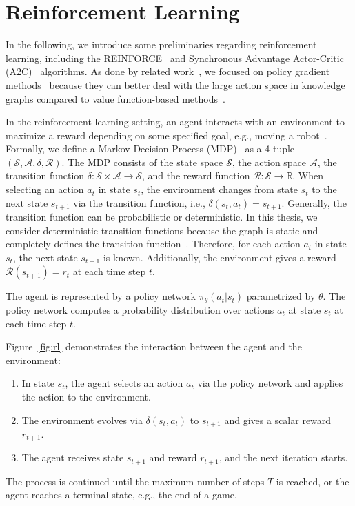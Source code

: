 \section{Reinforcement Learning}
\label{subsec:rl}
In the following, we introduce some preliminaries regarding reinforcement learning,
including the REINFORCE~\cite{Williams1992REINFORCE} and Synchronous Advantage Actor-Critic (A2C)~\cite{Mnih2016A2C} algorithms.
As done by related work~\cite{Xiong2017DeePpath, Das2018Minerva, Kaiser2021Reinforcement}, we focused on policy gradient methods~\cite{Sutton1998RL} because 
they can better deal with the large action space in knowledge graphs compared to value function-based methods~\cite{Xiong2017DeePpath}.

In the reinforcement learning setting, an agent interacts with an environment to maximize a reward 
depending on some specified goal, e.g., moving a robot~\cite{Peng2018Mimic}.
Formally, we define a Markov Decision Process (MDP)~\cite{Sutton1998RL} as a 4-tuple 
$(\mathcal{S}, \mathcal{A}, \delta, \mathcal{R})$. The MDP consists of the state space $\mathcal{S}$,
 the action space $\mathcal{A}$, the transition function $\delta : \mathcal{S} \times 
 \mathcal{A} \rightarrow \mathcal{S}$, and the reward function 
 $\mathcal{R} : \mathcal{S} \rightarrow \mathbb{R}$.
When selecting an action $a_t$ in state $s_t$, the environment changes from state $s_t$ to the next state $s_{t+1}$ 
via the transition function, i.e., $\delta(s_t, a_t) = s_{t+1}$. 
Generally, the transition function can be probabilistic or deterministic. In this thesis, we consider 
deterministic transition functions because the graph is static and completely defines the transition function~\cite{Shen2018MWalk}. 
Therefore, for each action $a_t$ in state $s_t$, the next state $s_{t+1}$ is known.
Additionally, the environment gives a reward $\mathcal{R}(s_{t+1}) = r_t$ at each time step $t$.

The agent is represented by a policy network $\pi_{\theta}(a_t | s_t)$ parametrized by $\theta$.
The policy network computes a probability distribution over actions $a_t$ at state $s_t$ at each time step $t$.

Figure~\ref{fig:rl} demonstrates the interaction between the agent and the environment:
\begin{enumerate}
	\item In state $s_t$, the agent selects an action $a_t$ via the policy network and applies the action to the environment.
	\item The environment evolves via $\delta(s_t, a_t)$ to $s_{t+1}$ and gives a scalar reward $r_{t+1}$.
	\item The agent receives state $s_{t+1}$ and reward $r_{t+1}$, and the next iteration starts.
\end{enumerate}
The process is continued until the maximum number of steps $T$ is reached, or the agent reaches a terminal state, e.g., the end of a game.

